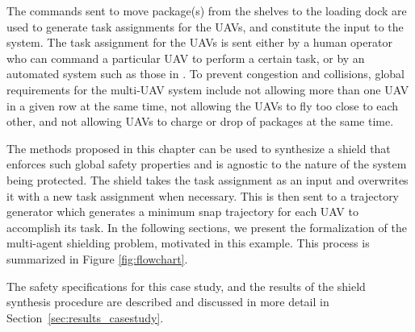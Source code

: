 The commands sent to move package(s) from the shelves to the loading dock are used to generate task assignments for the UAVs, and constitute the input to the system. The task assignment for the UAVs is sent either by a human operator who can command a particular UAV to perform a certain task, or by an automated system such as those in \cite{olivo2016method,kalyan2015automated}. To prevent congestion and collisions, global requirements for the multi-UAV system include not allowing more than one UAV in a given row at the same time, not allowing the UAVs to fly too close to each other, and not allowing UAVs to charge or drop of packages at the same time. 

The methods proposed in this chapter can be used to synthesize a shield that enforces such  global safety properties and is agnostic to the nature of the system being protected. The shield takes the task assignment as an input and overwrites it with a new task assignment when necessary.  This is then sent to a trajectory generator which generates a minimum snap trajectory for each UAV to accomplish its task. In the following sections, we present the formalization of the multi-agent shielding problem, motivated in this example.
This process is summarized in Figure \ref{fig:flowchart}. 
 
 The safety specifications for this case study, and the results of the shield synthesis procedure are described and discussed in more detail in Section~\ref{sec:results_casestudy}.

